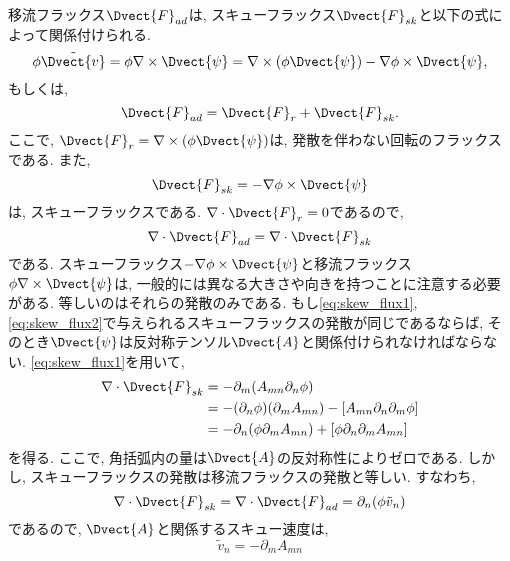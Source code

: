 移流フラックス$\Dvect{F}_{ad}$は, スキューフラックス$\Dvect{F}_{sk}$と以下の式によって関係付けられる. 
\begin{equation}
  \phi \tilde{\Dvect{v}} 
 = \phi \nabla \times \Dvect{\psi} 
 = \nabla \times (\phi \Dvect{\psi}) - \nabla \phi \times \Dvect{\psi}, 
\end{equation}
もしくは, 
\begin{equation}
  \Dvect{F}_{ad} = \Dvect{F}_{r} +\Dvect{F}_{sk}. 
\end{equation}
ここで, $\Dvect{F}_r=\nabla \times (\phi \Dvect{\psi})$は, 発散を伴わない回転のフラックスである.  
また, 
\begin{equation}
  \Dvect{F}_{sk} = - \nabla \phi \times \Dvect{\psi}
\label{eq:skew_flux2}
\end{equation}
は, スキューフラックスである. 
$\nabla \cdot \Dvect{F}_r=0$であるので, 
\begin{equation}
  \nabla \cdot \Dvect{F}_{ad} = \nabla \cdot \Dvect{F}_{sk}
\end{equation}
である. 
スキューフラックス$-\nabla \phi \times \Dvect{\psi}$と移流フラックス$\phi \nabla \times \Dvect{\psi}$は, 
一般的には異なる大きさや向きを持つことに注意する必要がある. 
等しいのはそれらの発散のみである. 
もし\eqref{eq:skew_flux1},\eqref{eq:skew_flux2}で与えられるスキューフラックスの発散が同じであるならば, 
そのとき$\Dvect{\psi}$は反対称テンソル$\Dvect{A}$と関係付けられなければならない. 
\eqref{eq:skew_flux1}を用いて, 
\begin{equation}
\begin{split}
   \nabla \cdot \Dvect{F}_{sk} 
   &= - \partial_m ( A_{mn} \partial_n \phi) \\
   &= - (\partial_n \phi) (\partial_m A_{mn}) - [A_{mn} \partial_n \partial_m \phi] \\
   &= - \partial_n (\phi \partial_m A_{mn}) + [\phi \partial_n \partial_m A_{mn}]
\end{split}
\end{equation}
を得る. 
ここで, 角括弧内の量は$\Dvect{A}$の反対称性によりゼロである. 
しかし, スキューフラックスの発散は移流フラックスの発散と等しい. 
すなわち, 
\begin{equation}
  \nabla \cdot \Dvect{F}_{sk} 
 = \nabla \cdot \Dvect{F}_{ad} 
 = \partial_n (\phi \tilde{v}_n)
\end{equation}
であるので, $\Dvect{A}$と関係するスキュー速度は, 
\begin{equation}
  \tilde{v}_n = - \partial_m A_{mn}
\label{eq:pseudovel_AntiSymTensor_relation}
\end{equation}

